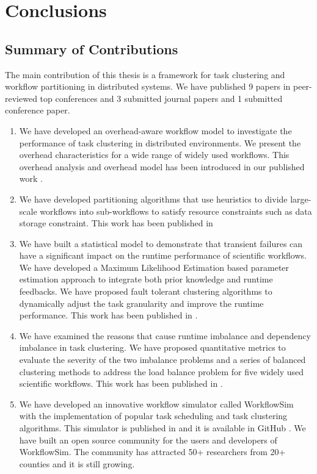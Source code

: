 \chapter{Conclusions}

\section{Summary of Contributions}


The main contribution of this thesis is a framework for task clustering and workflow partitioning in distributed systems. We have published 9 papers in peer-reviewed top conferences and 3 submitted journal papers and 1 submitted conference paper. 
\begin{enumerate}
\item We have developed an overhead-aware workflow model to investigate the performance of task clustering in distributed environments. We present the overhead characteristics for a wide range of widely used workflows. This overhead analysis and overhead model has been introduced in our published work \cite{Chen2013a, Chen2011, Chen2013b}. 
\item We have developed partitioning algorithms that use heuristics to divide large-scale workflows into sub-workflows to satisfy resource constraints such as data storage constraint. This work has been published in \cite{Chen2011a, Integration2012}
\item We have built a statistical model to demonstrate that transient failures can have a significant impact on the runtime performance of scientific workflows. We have developed a Maximum Likelihood Estimation based parameter estimation approach to integrate both prior knowledge and runtime feedbacks. We have proposed fault tolerant clustering algorithms to dynamically adjust the task granularity and improve the runtime performance. This work has been published in \cite{Chen2012}. 
\item We have examined the reasons that cause runtime imbalance and dependency imbalance in task clustering. We have proposed quantitative metrics to evaluate the severity of the two imbalance problems and a series of balanced clustering methods to address the load balance problem for five widely used scientific workflows. This work has been published in \cite{Chen2013a, Chen2013b}. 
\item We have developed an innovative workflow simulator called WorkflowSim with the implementation of popular task scheduling and task clustering algorithms. This simulator is published in \cite{WorkflowSim} and it is available in GitHub \cite{WorkflowSim-Github}. 
We have built an open source community for the users and developers of WorkflowSim. The community has attracted 50+ researchers from 20+ counties and it is still growing. 
\end{enumerate}




